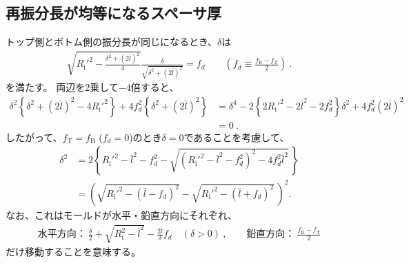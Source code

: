 \subsection{再振分長が均等になるスペーサ厚}
トップ側とボトム側の振分長が同じになるとき、$\delta$は
\begin{align*}
  \sqrt{R_\mathrm i'^2-\frac{\delta^2+(2\bar l)^2}4}\frac\delta{\sqrt{\delta^2+(2\bar l)^2}} = f_d \qquad
  \left(f_d \equiv \frac{f_\mathrm B-f_\mathrm T}2\right)\ .
\end{align*}
を満たす。
両辺を2乗して$-4$倍すると、
\begin{align*}
  \delta^2\left\{\delta^2+(2\bar l)^2-4R_\mathrm i'^2\right\}+4f_d^2\left\{\delta^2+(2\bar l)^2\right\}
  & = \delta^4-2\left\{2R_\mathrm i'^2-2\bar l^2-2f_d^2\right\}\delta^2+4f_d^2(2\bar l)^2\\
  & = 0\ .
\end{align*}
したがって、$f_\mathrm T = f_\mathrm B$ ($f_d = 0$)のとき$\delta = 0$であることを考慮して、
\begin{align*}
  \delta^2
  &= 2\left\{
       R_\mathrm i'^2-\bar l^2-f_d^2-\sqrt{\left(R_\mathrm i'^2-\bar l^2-f_d^2\right)^2-4f_d^2\bar l^2}\,
     \right\}\\
  &= \left(\sqrt{R_\mathrm i'^2-(\bar l-f_d)^2}-\sqrt{R_\mathrm i'^2-(\bar l+f_d)^2}\,\right)^{\!\!2}.
\end{align*}
なお、これはモールドが水平・鉛直方向にそれぞれ、
\begin{align*}
  \text{水平方向：}~\frac\delta2+\sqrt{R_\mathrm i^2-\bar l^2}-\frac{2\bar l}{\delta}f_d\quad(\delta>0)\ , \qquad
  \text{鉛直方向：}~\frac{f_\mathrm B-f_\mathrm T}2
\end{align*}
だけ移動することを意味する。



